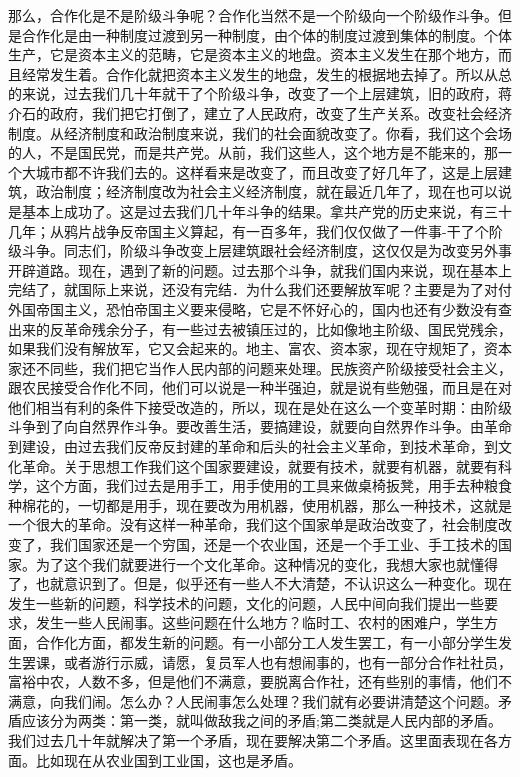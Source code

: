 那么，合作化是不是阶级斗争呢？合作化当然不是一个阶级向一个阶级作斗争。但是合作化是由一种制度过渡到另一种制度，由个体的制度过渡到集体的制度。个体生产，它是资本主义的范畴，它是资本主义的地盘。资本主义发生在那个地方，而且经常发生着。合作化就把资本主义发生的地盘，发生的根据地去掉了。所以从总的来说，过去我们几十年就干了个阶级斗争，改变了一个上层建筑，旧的政府，蒋介石的政府，我们把它打倒了，建立了人民政府，改变了生产关系。改变社会经济制度。从经济制度和政治制度来说，我们的社会面貌改变了。你看，我们这个会场的人，不是国民党，而是共产党。从前，我们这些人，这个地方是不能来的，那一个大城市都不许我们去的。这样看来是改变了，而且改变了好几年了，这是上层建筑，政治制度；经济制度改为社会主义经济制度，就在最近几年了，现在也可以说是基本上成功了。这是过去我们几十年斗争的结果。拿共产党的历史来说，有三十几年；从鸦片战争反帝国主义算起，有一百多年，我们仅仅做了一件事-干了个阶级斗争。同志们，阶级斗争改变上层建筑跟社会经济制度，这仅仅是为改变另外事开辟道路。现在，遇到了新的问题。过去那个斗争，就我们国内来说，现在基本上完结了，就国际上来说，还没有完结．为什么我们还要解放军呢？主要是为了对付外国帝国主义，恐怕帝国主义要来侵略，它是不怀好心的，国内也还有少数没有查出来的反革命残余分子，有一些过去被镇压过的，比如像地主阶级、国民党残余，如果我们没有解放军，它又会起来的。地主、富农、资本家，现在守规矩了，资本家还不同些，我们把它当作人民内部的问题来处理。民族资产阶级接受社会主义，跟农民接受合作化不同，他们可以说是一种半强迫，就是说有些勉强，而且是在对他们相当有利的条件下接受改造的，所以，现在是处在这么一个变革时期：由阶级斗争到了向自然界作斗争。要改善生活，要搞建设，就要向自然界作斗争。由革命到建设，由过去我们反帝反封建的革命和后头的社会主义革命，到技术革命，到文化革命。关于思想工作我们这个国家要建设，就要有技术，就要有机器，就要有科学，这个方面，我们过去是用手工，用手使用的工具来做桌椅扳凳，用手去种粮食种棉花的，一切都是用手，现在要改为用机器，使用机器，那么一种技术，这就是一个很大的革命。没有这样一种革命，我们这个国家单是政治改变了，社会制度改变了，我们国家还是一个穷国，还是一个农业国，还是一个手工业、手工技术的国家。为了这个我们就要进行一个文化革命。这种情况的变化，我想大家也就懂得了，也就意识到了。但是，似乎还有一些人不大清楚，不认识这么一种变化。现在发生一些新的问题，科学技术的问题，文化的问题，人民中间向我们提出一些要求，发生一些人民闹事。这些问题在什么地方？临时工、农村的困难户，学生方面，合作化方面，都发生新的问题。有一小部分工人发生罢工，有一小部分学生发生罢课，或者游行示威，请愿，复员军人也有想闹事的，也有一部分合作社社员，富裕中农，人数不多，但是他们不满意，要脱离合作社，还有些别的事情，他们不满意，向我们闹。怎么办？人民闹事怎么处理？我们就有必要讲清楚这个问题。矛盾应该分为两类：第一类，就叫做敌我之间的矛盾;第二类就是人民内部的矛盾。我们过去几十年就解决了第一个矛盾，现在要解决第二个矛盾。这里面表现在各方面。比如现在从农业国到工业国，这也是矛盾。

